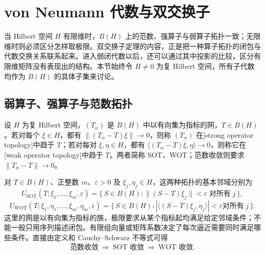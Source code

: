 

\section{von Neumann 代数与双交换子}
\label{b2:sec:D04}

当 Hilbert 空间 \(H\) 有限维时，\(B(H)\) 上的范数、强算子与弱算子拓扑一致；无限维时则必须区分怎样取极限。双交换子定理的内容，正是把一种算子拓扑的闭包与代数交换关系联系起来。进入弱闭代数以后，还可以通过其中投影的比较，区分有限维矩阵没有表现出的结构。本节始终令 \(H\ne0\) 为复 Hilbert 空间，所有子代数均作为 \(B(H)\) 的具体子集来讨论。

\subsection{弱算子、强算子与范数拓扑}
\label{b2:subsec:D04:01}

\begin{definition}\label{b2:def:operator-topologies}
	设 \(H\) 为复 Hilbert 空间，\((T_\alpha)\) 是 \(B(H)\) 中以有向集为指标的网，\(T\in B(H)\)。若对每个 \(\xi\in H\)，都有 \(\bigl\lVert(T_\alpha-T)\xi\bigr\rVert\to0\)，则称 \((T_\alpha)\) 在[strong operator topology]中趋于 \(T\)；若对每对 \(\xi,\eta\in H\)，都有 \(\bigl\langle(T_\alpha-T)\xi,\eta\bigr\rangle\to0\)，则称它在[weak operator topology]中趋于 \(T\)。两者简称 SOT、WOT；范数收敛则要求 \(\|T_\alpha-T\|\to0\)。
\end{definition}

对 \(T\in B(H)\)、正整数 \(m\)、\(\varepsilon>0\) 及 \(\xi_j,\eta_j\in H\)，这两种拓扑的基本邻域分别为
\[
	U_{\mathrm{SOT}}(T;\xi_1,\ldots,\xi_m,\varepsilon) =\bigl\{\,S\in B(H):\|(S-T)\xi_j\|<\varepsilon\;\text{对所有}\;j\,\bigr\},
\]
\[
	U_{\mathrm{WOT}}(T;\xi_1,\eta_1,\ldots,\xi_m,\eta_m,\varepsilon) =\bigl\{\,S\in B(H):|\langle(S-T)\xi_j,\eta_j\rangle|<\varepsilon \text{对所有}\;j\,\bigr\}.
\]
这里的网是以有向集为指标的族，极限要求从某个指标起均满足给定邻域条件；不能一般只用序列描述闭包。有限组向量或矩阵系数决定了每次逼近需要同时满足哪些条件。直接由定义和 Cauchy--Schwarz 不等式可得
\[
	\text{范数收敛}\ \Longrightarrow\ \text{SOT 收敛}\ \Longrightarrow\ \text{WOT 收敛}.
\]

